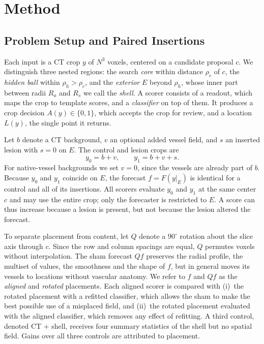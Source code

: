 \section{Method}
\label{sec:method}
\subsection{Problem Setup and Paired Insertions}
\label{sec:design}
Each input is a CT crop $y$ of $N^3$ voxels, centered on a candidate proposal $c$. We distinguish three nested regions: the search \emph{core} within distance $\rho_c$ of $c$, the \emph{hidden ball} within $\rho_h>\rho_c$, and the \emph{exterior} $E$ beyond $\rho_h$, whose inner part between radii $R_a$ and $R_s$ we call the \emph{shell}. A scorer consists of a readout, which maps the crop to template scores, and a \emph{classifier} on top of them. It produces a crop decision $A(y)\in\{0,1\}$, which accepts the crop for review, and a location $L(y)$, the single point it returns.

Let $b$ denote a CT background, $v$ an optional added vessel field, and $s$ an inserted lesion with $s=0$ on $E$. The control and lesion crops are
\begin{equation}
y_0=b+v,\qquad y_1=b+v+s .
\label{eq:pair}
\end{equation}
For native-vessel backgrounds we set $v=0$, since the vessels are already part of $b$. Because $y_0$ and $y_1$ coincide on $E$, the forecast $f=F(y|_E)$ is identical for a control and all of its insertions. All scorers evaluate $y_0$ and $y_1$ at the same center $c$ and may use the entire crop; only the forecaster is restricted to $E$. A score can thus increase because a lesion is present, but not because the lesion altered the forecast.

To separate placement from content, let $Q$ denote a $90^\circ$ rotation about the slice axis through $c$. Since the row and column spacings are equal, $Q$ permutes voxels without interpolation. The sham forecast $Qf$ preserves the radial profile, the multiset of values, the smoothness and the shape of $f$, but in general moves its vessels to locations without vascular anatomy. We refer to $f$ and $Qf$ as the \emph{aligned} and \emph{rotated} placements. Each aligned scorer is compared with (i)~the rotated placement with a refitted classifier, which allows the sham to make the best possible use of a misplaced field, and (ii)~the rotated placement evaluated with the aligned classifier, which removes any effect of refitting. A third control, denoted CT + shell, receives four summary statistics of the shell but no spatial field. Gains over all three controls are attributed to placement.

